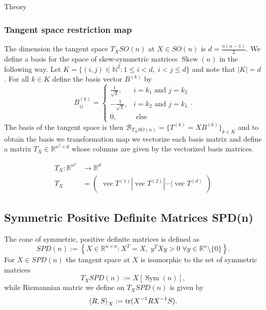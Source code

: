 \begin{chapter}{Theory}
\subsubsection{Tangent space restriction map} %
\label{ssub:TangentSO}
The dimension the tangent space $T_XSO(n)$ at $X\in SO(n)$ is $d=\frac{n(n-1)}{2}$. We define a basis for the space of skew-symmetric matrices $\operatorname{Skew}(n)$ in the following
way. Let $K = \lbrace (i,j)\in\mathbb{N}^2: 1\leq i < d,\; i < j \leq d  \rbrace$ and note that $|K|=d$. For all $k\in K$ define the basis vector $B^{(k)}$ by 
\begin{equation}
    B^{(k)}_{ij}=\begin{cases}
	\frac{1}{\sqrt{2}}, & i=k_1 \text{ and } j=k_2\\
	-\frac{1}{\sqrt{2}}, & i=k_2 \text{ and } j=k_1\\
	0, & \text{ else }
    \end{cases}.
\end{equation}
The basis of the tangent space is then $\mathcal{B}_{T_XSO(n)}=\lbrace T^{(k)} = XB^{(k)} \rbrace_{k\in K}$ and to obtain the basis we transformation map
we vectorize each basis matrix and define a matrix $T_X\in\mathbb{R}^{n^2\times d}$ whose columns are given by the vectorized basis matrices.

\begin{align}
    T_X: \mathbb{R}^{n^2} &\to \mathbb{R}^{d}\\
    T_X&= \begin{pmatrix}
	\operatorname{vec}T^{(1)}|\operatorname{vec}T^{(2)}|\cdots|\operatorname{vec}T^{(d)}
    \end{pmatrix}
\end{align}


\subsection{Symmetric Positive Definite Matrices SPD(n)} %
\label{sub:SPD(N)}
The cone of symmetric, positive definite matrices is defined as
\begin{equation}
    SPD(n):=\left\lbrace X\in\mathbb{R}^{n\times n}:X^T=X,\; y^TXy>0\; \forall y\in\mathbb{R}^n\setminus\lbrace 0\rbrace  \right\rbrace.
\end{equation}
For $X\in SPD(n)$ the tangent space at $X$ is isomorphic to the set of symmetric matrices
\begin{equation}
    T_XSPD(n):=X[\operatorname{Sym}(n)],
\end{equation}
while Riemannian matric we define on $T_XSPD(n)$ is given by
\begin{equation}
    \label{eq:spdmetric}
    \left\langle R,S \right\rangle_X := \operatorname{tr}(X^{-1}RX^{-1}S).
\end{equation}


\end{chapter}
